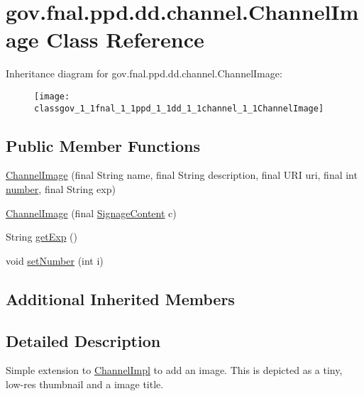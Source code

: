\hypertarget{classgov_1_1fnal_1_1ppd_1_1dd_1_1channel_1_1ChannelImage}{\section{gov.\-fnal.\-ppd.\-dd.\-channel.\-Channel\-Image Class Reference}
\label{classgov_1_1fnal_1_1ppd_1_1dd_1_1channel_1_1ChannelImage}
}
Inheritance diagram for gov.\-fnal.\-ppd.\-dd.\-channel.\-Channel\-Image\-:\begin{figure}[H]
\begin{center}
\leavevmode
\texttt{[image: classgov\_1\_1fnal\_1\_1ppd\_1\_1dd\_1\_1channel\_1\_1ChannelImage]}
\end{center}
\end{figure}
\subsection*{Public Member Functions}
\begin{DoxyCompactItemize}
\item 
\hyperlink{classgov_1_1fnal_1_1ppd_1_1dd_1_1channel_1_1ChannelImage_ab18718b659f333b1858606312779339c}{Channel\-Image} (final String name, final String description, final U\-R\-I uri, final int \hyperlink{classgov_1_1fnal_1_1ppd_1_1dd_1_1channel_1_1ChannelImpl_ae4de39eb5e2f7c434f3b71f054ae9735}{number}, final String exp)
\item 
\hyperlink{classgov_1_1fnal_1_1ppd_1_1dd_1_1channel_1_1ChannelImage_a5e00f8dc7d13b8d9186dbbea54f5205a}{Channel\-Image} (final \hyperlink{interfacegov_1_1fnal_1_1ppd_1_1dd_1_1signage_1_1SignageContent}{Signage\-Content} c)
\item 
String \hyperlink{classgov_1_1fnal_1_1ppd_1_1dd_1_1channel_1_1ChannelImage_a3b35ca4da6e88f0f2f2e18fd2c4be85e}{get\-Exp} ()
\item 
void \hyperlink{classgov_1_1fnal_1_1ppd_1_1dd_1_1channel_1_1ChannelImage_ae2edd21f7326063ec9aa3f0828c4398b}{set\-Number} (int i)
\end{DoxyCompactItemize}
\subsection*{Additional Inherited Members}


\subsection{Detailed Description}
Simple extension to \hyperlink{classgov_1_1fnal_1_1ppd_1_1dd_1_1channel_1_1ChannelImpl}{Channel\-Impl} to add an image. This is depicted as a tiny, low-\/res thumbnail and a image title.


